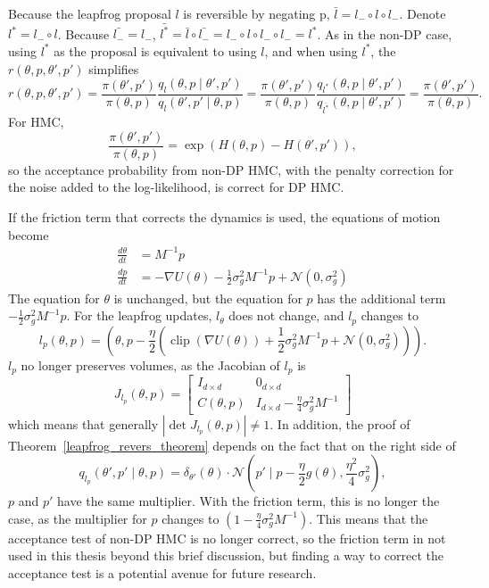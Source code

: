 \documentclass[english,twoside,openright]{HYgraduMLDS}
\newcommand{\caln}{{\mathcal{N}}}
\DeclareMathOperator{\clip}{clip}
\begin{document}
Because the leapfrog proposal \(l\) is reversible by negating p,
\(\bar{l} = l_{-} \circ l\circ l_{-}\). Denote \(l^{*} = l_{-}\circ l\).
Because \(\bar{l_{-}} = l_{-}\),
\(\bar{l^{*}} = \bar{l}\circ \bar{l_{-}}
= l_{-}\circ l\circ l_{-}\circ l_{-} = l^{*}\).
As in the non-DP case, using \(l^{*}\) as the proposal is equivalent to using
\(l\), and when using \(l^{*}\), the \(r(\theta, p, \theta', p')\) simplifies
\[
  r(\theta, p, \theta', p')
  = \frac{\pi(\theta', p')}{\pi(\theta, p)}
  \frac{q_{l}(\theta, p\mid \theta', p')}{q_{l}(\theta', p'\mid \theta, p)}
  = \frac{\pi(\theta', p')}{\pi(\theta, p)}
  \frac{q_{l^{*}}(\theta, p\mid \theta', p')}{q_{\bar{l^{*}}}(\theta, p\mid \theta', p')}
  = \frac{\pi(\theta', p')}{\pi(\theta, p)}.
\]
For HMC,
\[
  \frac{\pi(\theta', p')}{\pi(\theta, p)} = \exp(H(\theta, p) - H(\theta', p')),
\]
so the acceptance probability from non-DP HMC, with the penalty correction for
the noise added to the log-likelihood, is correct for DP HMC.

If the friction term that corrects the dynamics is used, the equations of
motion become~\cite{CFG14}
\begin{align*}
  \frac{d\theta}{dt} &= M^{-1}p \\
  \frac{dp}{dt} &= -\nabla U(\theta) - \frac{1}{2}\sigma_{g}^{2}M^{-1}p + \caln(0, \sigma_{g}^{2})
\end{align*}
The equation for \(\theta\) is unchanged, but the equation for \(p\) has the
additional term \(-\frac{1}{2}\sigma_{g}^{2}M^{-1}p\).
For the leapfrog updates, \(l_{\theta}\) does not change, and \(l_{p}\) changes
to
\[
  l_{p}(\theta, p) = \left(\theta, p - \frac{\eta}{2}(\clip(\nabla U(\theta))
  + \frac{1}{2}\sigma_{g}^{2}M^{-1}p + \caln(0, \sigma_{g}^{2}))\right).
\]
\(l_{p}\) no longer preserves volumes, as the Jacobian of \(l_{p}\) is
\[
  J_{l_{p}}(\theta, p) =
  \begin{bmatrix}
    I_{d\times d} & 0_{d\times d} \\
    C(\theta, p) & I_{d\times d} - \frac{\eta}{4}\sigma_{g}^{2}M^{-1}
  \end{bmatrix}
\]
which means that generally \(|\det J_{l_{p}}(\theta, p)| \neq 1\).
In addition, the proof of Theorem~\ref{leapfrog_revers_theorem} depends on the
fact that on the right side of
\[
  q_{l_{p}}(\theta', p'\mid \theta, p)
  = \delta_{\theta'}(\theta)\cdot \caln\left(p'\mid p
    - \frac{\eta}{2}g(\theta), \frac{\eta^{2}}{4}\sigma_{g}^{2}\right),
\]
\(p\) and \(p'\) have the same multiplier. With the friction term, this is
no longer the case, as the multiplier for \(p\) changes to
\((1 - \frac{\eta}{4}\sigma_{g}^{2}M^{-1})\).
This means that the acceptance test of non-DP HMC is no longer correct, so
the friction term in not used in this thesis beyond this brief discussion,
but finding a way to correct the acceptance test is a potential avenue for
future research.
\end{document}
